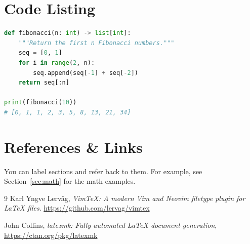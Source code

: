 \documentclass[12pt, a4paper]{article}
\begin{document}
\section{Code Listing}

\begin{lstlisting}[language=Python, caption={A simple Python example}]
def fibonacci(n: int) -> list[int]:
    """Return the first n Fibonacci numbers."""
    seq = [0, 1]
    for i in range(2, n):
        seq.append(seq[-1] + seq[-2])
    return seq[:n]

print(fibonacci(10))
# [0, 1, 1, 2, 3, 5, 8, 13, 21, 34]
\end{lstlisting}

\section{References \& Links}

You can label sections and refer back to them. For example, see
Section~\ref{sec:math} for the math examples.

\begin{thebibliography}{9}
	Karl Yngve Lervåg,
	\textit{VimTeX: A modern Vim and Neovim filetype plugin for LaTeX files}.
	\url{https://github.com/lervag/vimtex}

	John Collins,
	\textit{latexmk: Fully automated LaTeX document generation},
	\url{https://ctan.org/pkg/latexmk}
\end{thebibliography}

\end{document}
